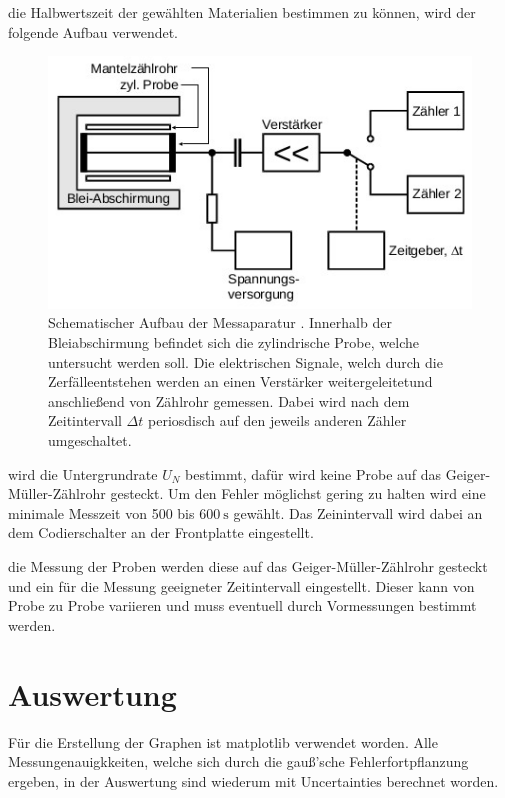     \justifying die Halbwertszeit der gewählten Materialien bestimmen zu können, wird der folgende Aufbau verwendet.
    \begin{figure}
        \centering
        \includegraphics[width=\textwidth]{images/aufbau.jpg}
        \caption{Schematischer Aufbau der Messaparatur \cite{V702}. Innerhalb der Bleiabschirmung befindet sich
        die zylindrische Probe, welche untersucht werden soll. Die elektrischen Signale,
        welch durch die Zerfälleentstehen werden an einen Verstärker weitergeleitetund
        anschließend von Zählrohr gemessen. Dabei wird nach dem Zeitintervall $\Delta t$ periosdisch auf
        den jeweils anderen Zähler umgeschaltet.
        }
        \label{fig:3}
    \end{figure}
    \justifying wird die Untergrundrate $U_N$ bestimmt, dafür wird keine Probe auf das Geiger-Müller-Zählrohr gesteckt.
    Um den Fehler möglichst gering zu halten wird eine  minimale Messzeit von 500 bis $\SI{600}{\second} $ gewählt. Das Zeinintervall
    wird dabei an dem Codierschalter an der Frontplatte eingestellt.

    
    \justifying die Messung der Proben werden diese auf das Geiger-Müller-Zählrohr gesteckt und ein
    für die Messung geeigneter Zeitintervall eingestellt. Dieser kann von Probe zu Probe variieren und muss
    eventuell durch Vormessungen bestimmt werden.


\section{Auswertung}
Für die Erstellung der Graphen ist matplotlib \cite{matplotlib} verwendet worden.
Alle Messungenauigkkeiten, welche sich durch die gauß'sche Fehlerfortpflanzung ergeben,
in der Auswertung sind wiederum mit Uncertainties \cite{uncertainties}
berechnet worden.\\

